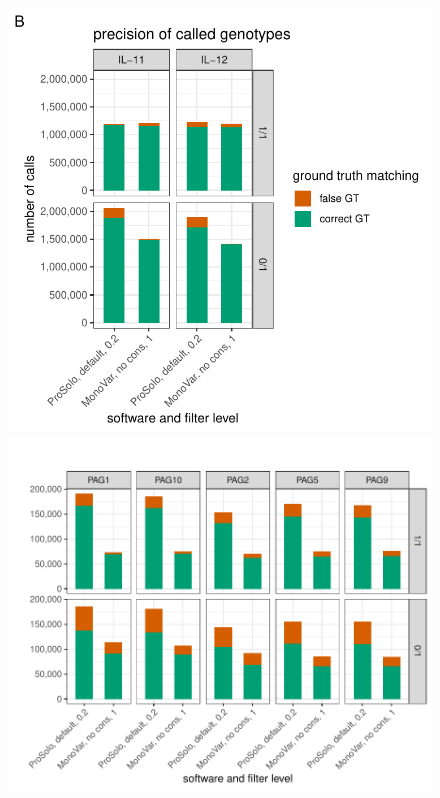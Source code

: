 \documentclass[authoryear,preprint,11pt]{scrartcl}
\begin{document}
\begin{figure}[!tpb]
\begin{minipage}{.53\linewidth}
 \end{minipage}
 \begin{minipage}{.45\linewidth}
  \includegraphics[width=\linewidth]{figs/Dong2017/Dong2017_genotyping_precision_prosolo_monovar.pdf}
  \end{minipage}
 \begin{minipage}{.53\linewidth}
  \includegraphics[width=\linewidth]{figs/Laehnemann2017/Laehnemann2017_genotyping_precision_prosolo_monovar.pdf}

\end{minipage}
\end{figure}
\end{document}
